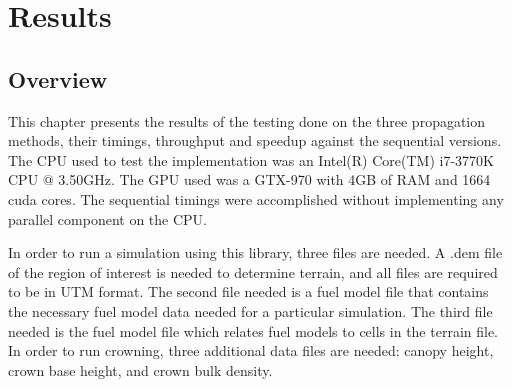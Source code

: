 \chapter{Results}
\label{chapter:results}

\section{Overview}
This chapter presents the results of the testing done on the three propagation methods, their timings, throughput and speedup against the sequential versions. The CPU used to test the implementation was an Intel(R) Core(TM) i7-3770K CPU @ 3.50GHz. The GPU used was a GTX-970 with 4GB of RAM and 1664 cuda cores. The sequential timings were accomplished without implementing any parallel component on the CPU. 

In order to run a simulation using this library, three files are needed. A .dem file of the region of interest is needed to determine terrain, and all files are required to be in UTM format. The second file needed is a fuel model file that contains the necessary fuel model data needed for a particular simulation. The third file needed is the fuel model file which relates fuel models to cells in the terrain file. In order to run crowning, three additional data files are needed: canopy height, crown base height, and crown bulk density. 

